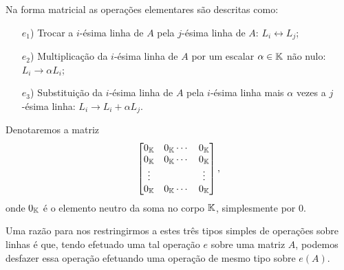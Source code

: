 Na forma matricial as opera\c{c}\~oes elementares s\~ao descritas como:
\begin{itemize}
	\item[$e_1$)] Trocar a $i$-\'esima linha de $A$ pela $j$-\'esima linha de $A$: $L_i \leftrightarrow L_j$;
	\item[$e_2$)] Multiplica\c{c}\~ao da $i$-\'esima linha de $A$ por um escalar $\alpha \in \mathbb{K}$ n\~ao nulo: $L_i \rightarrow \alpha L_i$;
	\item[$e_3$)] Substitui\c{c}\~ao da $i$-\'esima linha de $A$ pela $i$-\'esima linha mais $\alpha$ vezes a $j$-\'esima linha: $L_i \rightarrow L_i + \alpha L_j$.
\end{itemize}

\begin{observacao}
Denotaremos a matriz
\[
\begin{bmatrix}
0_{\mathbb{K}} & 0_{\mathbb{K}} \cdots & 0_{\mathbb{K}}\\
0_{\mathbb{K}} & 0_{\mathbb{K}} \cdots & 0_{\mathbb{K}}\\
\vdots & & \vdots\\
0_{\mathbb{K}} & 0_{\mathbb{K}} \cdots & 0_{\mathbb{K}}
\end{bmatrix},
\]
onde $0_{\mathbb{K}}$ \'e o elemento neutro da soma no corpo $\mathbb{K}$, simplesmente por $0$.
\end{observacao}

Uma raz\~ao para nos restringirmos a estes tr\^es tipos simples de opera\c{c}\~oes sobre linhas \'e que, tendo efetuado uma tal opera\c{c}\~ao $e$ sobre uma matriz $A$, podemos desfazer essa opera\c{c}\~ao efetuando uma opera\c{c}\~ao de mesmo tipo sobre $e(A)$.

